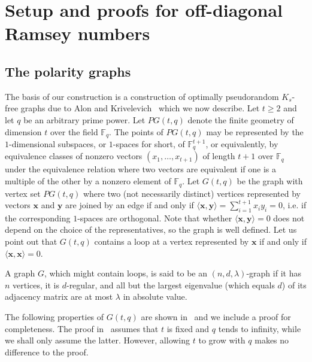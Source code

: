\documentclass{article}
\theoremstyle{plain}
\theoremstyle{definition}
\newcommand{\bF}{\mathbb{F}}
\newcommand{\bx}{\mathbf{x}}
\newcommand{\by}{\mathbf{y}}
\begin{document}
\section{Setup and proofs for off-diagonal Ramsey numbers} \label{sec:main}

\subsection{The polarity graphs} \label{subsec:Gtq}
The basis of our construction is a construction of optimally pseudorandom $K_s$-free graphs due to Alon and Krivelevich~\cite{alon-krivelevich} which we now describe. Let $t \ge 2$ and let $q$ be an arbitrary prime power. Let $PG(t, q)$ denote the finite geometry of dimension $t$ over the field $\bF_q$. The points of $PG(t, q)$ may be represented by the $1$-dimensional subspaces, or $1$-spaces for short, of $\bF_q^{t+1}$, or equivalently, by equivalence classes of nonzero vectors $(x_1, \dots, x_{t+1})$ of length $t+1$ over $\bF_q$ under the equivalence relation where two vectors are equivalent if one is a multiple of the other by a nonzero element of $\bF_q$. Let $G(t, q)$ be the graph with vertex set $PG(t, q)$ where two (not necessarily distinct) vertices represented by vectors $\bx$ and $\by$ are joined by an edge if and only if $\langle \bx, \by \rangle = \sum_{i=1}^{t+1} x_i y_i = 0$, i.e. if the corresponding $1$-spaces are orthogonal. Note that whether $\langle \bx, \by \rangle = 0$ does not depend on the choice of the representatives, so the graph is well defined. Let us point out that $G(t, q)$ contains a loop at a vertex represented by $\bx$ if and only if $\langle \bx, \bx \rangle = 0$.

A graph $G$, which might contain loops, is said to be an $(n, d, \lambda)$-graph if it has $n$ vertices, it is $d$-regular, and all but the largest eigenvalue (which equals $d$) of its adjacency matrix are at most $\lambda$ in absolute value.

The following properties of $G(t, q)$ are shown in~\cite{alon-krivelevich} and we include a proof for completeness. The proof in~\cite{alon-krivelevich} assumes that $t$ is fixed and $q$ tends to infinity, while we shall only assume the latter. However, allowing $t$ to grow with $q$ makes no difference to the proof.
\end{document}
